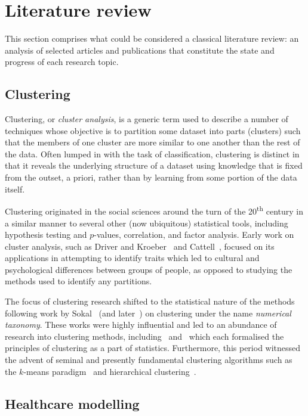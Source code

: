\section{Literature review}\label{sec:review}

This section comprises what could be considered a classical literature review:
an analysis of selected articles and publications that constitute the state and
progress of each research topic.

\subsection{Clustering}

Clustering, or \emph{cluster analysis}, is a generic term used to describe a
number of techniques whose objective is to partition some dataset into parts
(clusters) such that the members of one cluster are more similar to one another
than the rest of the data. Often lumped in with the task of classification,
clustering is distinct in that it reveals the underlying structure of a dataset
using knowledge that is fixed from the outset, a priori, rather than by learning
from some portion of the data itself.

Clustering originated in the social sciences around the turn of the
20\textsuperscript{th} century in a similar manner to several other (now
ubiquitous) statistical tools, including hypothesis testing and \(p\)-values,
correlation, and factor analysis. Early work on cluster analysis, such as Driver
and Kroeber~\cite{Driver1932} and Cattell~\cite{Cattell1943}, focused on its
applications in attempting to identify traits which led to cultural and
psychological differences between groups of people, as opposed to studying the
methods used to identify any partitions.

The focus of clustering research shifted to the statistical nature of the
methods following work by Sokal~\cite{Sokal1966} (and later~\cite{Sneath1973})
on clustering under the name \emph{numerical taxonomy}. These works were highly
influential and led to an abundance of research into clustering methods,
including~\cite{Diday1976} and~\cite{Hartigan1975} which each formalised the
principles of clustering as a part of statistics. Furthermore, this period
witnessed the advent of seminal and presently fundamental clustering algorithms
such as the \(k\)-means paradigm~\cite{Hartigan1979} and hierarchical
clustering~\cite{Defays1977,Sibson1973}.

\subsection{Healthcare modelling}

